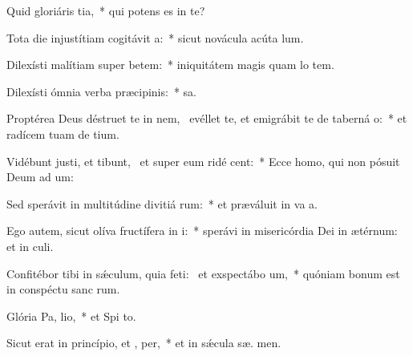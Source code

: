 \item Quid gloriáris  tia,~* qui potens es in te?
\item Tota die injustítiam cogitávit  a:~* sicut novácula acúta  lum.
\item Dilexísti malítiam super betem:~* iniquitátem magis quam lo tem.
\item Dilexísti ómnia verba præcipinis:~*  sa.
\item Proptérea Deus déstruet te in nem,~\pscross{} evéllet te, et emigrábit te de taberná o:~* et radícem tuam de  tium.
\item Vidébunt justi, et tibunt,~\pscross{} et super eum ridé  cent:~* Ecce homo, qui non pósuit Deum ad um:
\item Sed sperávit in multitúdine divitiá rum:~* et præváluit in va a.
\item Ego autem, sicut olíva fructífera in  i:~* sperávi in misericórdia Dei in ætérnum: et in  culi.
\item Confitébor tibi in sǽculum, quia feti:~\pscross{} et exspectábo  um,~* quóniam bonum est in conspéctu sanc rum.
\item Glória Pa,  lio,~* et Spi to.
\item Sicut erat in princípio, et ,  per,~* et in sǽcula sæ. men.
